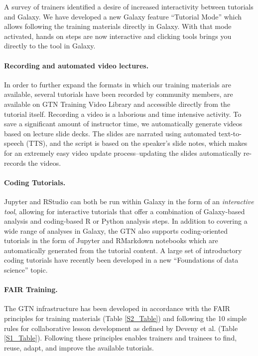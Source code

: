 A survey of trainers identified a desire of increased interactivity between tutorials and Galaxy. We have developed a new Galaxy feature ``Tutorial Mode'' which allows following the training materials directly in Galaxy. With that mode activated, hands on steps are now interactive and clicking tools brings you directly to the tool in Galaxy.

\paragraph{Recording and automated video lectures.} In order to further expand the formats in which our training materials are available, several tutorials have been recorded by community members, are available on GTN Training Video Library \cite{gtn-video-library} and accessible directly from the tutorial itself. Recording a video is a laborious and time intensive activity. To save a significant amount of instructor time, we automatically generate videos based on lecture slide decks. The slides are narrated using automated text-to-speech (TTS), and the script is based on the speaker's slide notes, which makes for an extremely easy video update process--updating the slides automatically re-records the videos. 

\paragraph{Coding Tutorials.} Jupyter and RStudio \cite{allaire2012rstudio} can both be run within Galaxy in the form of an \emph{interactive tool}, allowing for interactive tutorials that offer a combination of Galaxy-based analysis and coding-based R or Python analysis steps. In addition to covering a wide range of analyses in Galaxy, the GTN also supports coding-oriented tutorials in the form of Jupyter \cite{ragan2014jupyter} and RMarkdown \cite{baumer2015r} notebooks which are automatically generated from the tutorial content. A large set of introductory coding tutorials have recently been developed in a new ``Foundations of data science'' topic. 

\paragraph{FAIR Training.} The GTN infrastructure has been developed in accordance with the FAIR principles for training materials \cite{Garcia2020} (Table \ref{S2_Table}) and following the 10 simple rules for collaborative lesson development as defined by Deveny et al. \cite{Devenyi_2018} (Table \ref{S1_Table}). Following these principles enables trainers and trainees to find, reuse, adapt, and improve the available tutorials. 


